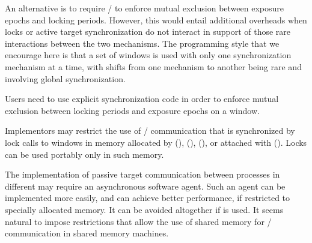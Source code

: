 \begin{rationale}
An alternative is to require \MPI/ to enforce mutual exclusion between exposure epochs and locking periods.  However, this would entail additional
overheads when locks or active target synchronization do not interact
in support of those rare interactions between the two mechanisms.  The
programming style that we encourage here is that a set of windows is
used with only one synchronization mechanism at a time, with shifts
from one mechanism to another being rare and involving global synchronization.
\end{rationale}

\begin{users}
Users need to use explicit synchronization code in order to enforce
mutual exclusion between locking periods and exposure epochs on a
window.
\end{users}

%
%
Implementors may restrict the use of \RMA/ communication that is 
synchronized by lock calls to windows in memory allocated by 
(),
 (),
 (), or attached with
 \gb().
Locks can be used portably only in such memory.

\begin{rationale}
The implementation of passive target communication between processes in different 
may require an asynchronous software 
agent.  Such an agent can be implemented more easily, and can achieve
better performance, if restricted to specially allocated memory.  It
can be avoided altogether if  is used. It seems natural to
impose restrictions that allow the use of shared memory for
\RMA/ communication in shared memory machines.

\end{rationale}

